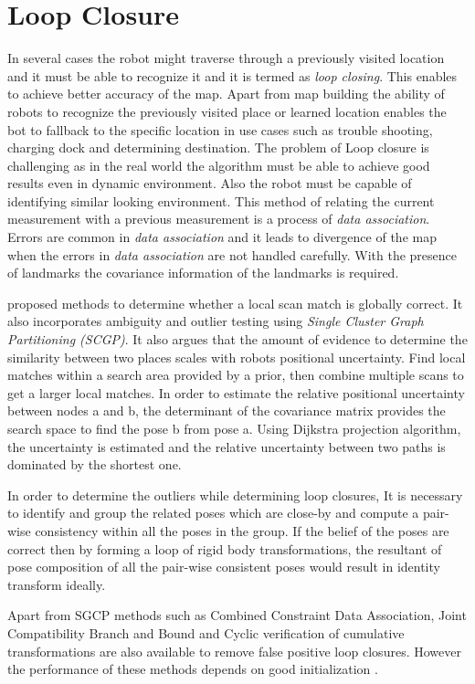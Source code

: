 \section{Loop Closure}
In several cases the robot might traverse through a previously visited location and it must be able to recognize it and it is termed as \textit{loop closing}. This enables to achieve better accuracy of the map. Apart from map building the ability of robots to recognize the previously visited place or learned location enables the bot to fallback to the specific location in use cases such as trouble shooting, charging dock and determining destination. The problem of Loop closure is challenging as in the real world the algorithm must be able to achieve good results even in dynamic environment. Also the robot must be capable of identifying similar looking environment. This method of relating the current measurement with a previous measurement is a process of \textit{data association}. Errors are common in \textit{data association} and it leads to divergence of the map when the errors in \textit{data association} are not handled carefully. With the presence of landmarks the covariance information of the landmarks is required.
\par
\cite{E.Olson/LocalSM} proposed methods to determine whether a local scan match is globally correct. It also incorporates ambiguity and outlier testing using \textit{Single Cluster Graph Partitioning (SCGP)}. It also argues that the amount of evidence to determine the similarity between two places scales with robots positional uncertainty. Find local matches within a search area provided by a prior, then combine multiple scans to get a larger local matches. In order to estimate the relative positional uncertainty between nodes a and b, the determinant of the covariance matrix provides the search space to find the pose b from pose a. Using Dijkstra projection algorithm, the uncertainty is estimated and the relative uncertainty between two paths is dominated by the shortest one. 
\par
In order to  determine the outliers while determining loop closures, It is necessary to identify and group the related poses which are close-by and compute a pair-wise consistency within all the poses in the group. If the belief of the poses are correct then by forming a loop of rigid body transformations, the resultant of pose composition of all the pair-wise consistent poses would result in identity transform ideally. 
\par
Apart from SGCP methods such as Combined Constraint Data Association, Joint Compatibility Branch and Bound and Cyclic verification of cumulative transformations are also available to remove false positive loop closures. However the performance of these methods depends on good initialization \cite{P.Agarwal}.

